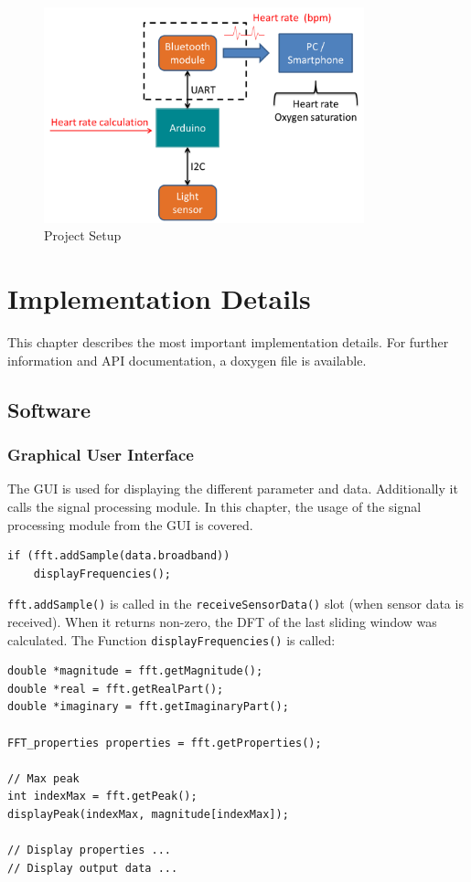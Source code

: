 \documentclass[notitlepage]{scrreprt}
\begin{document}
\begin{figure}[H]
	\centering
	\includegraphics[width=350px]{images/general_dataFlow_first.png}
	\caption{Project Setup}
	\label{fig:data-flow1}
\end{figure}

\chapter{Implementation Details}
\label{chap:impl-details}
This chapter describes the most important implementation details. For further information and API documentation, a doxygen file is available.

\section{Software}
\subsection{Graphical User Interface}
The GUI is used for displaying the different parameter and data. Additionally it calls the signal processing module. In this chapter, the usage of the signal processing module from the GUI is covered.

\begin{lstlisting}[caption=MainWindow.cpp]
if (fft.addSample(data.broadband))
	displayFrequencies();
\end{lstlisting}

\lstinline{fft.addSample()} is called in the \lstinline{receiveSensorData()} slot (when sensor data is received). When it returns non-zero, the DFT of the last sliding window was calculated. The Function \lstinline{displayFrequencies()} is called:

\begin{lstlisting}[caption=MainWindow.cpp]
double *magnitude = fft.getMagnitude();
double *real = fft.getRealPart();
double *imaginary = fft.getImaginaryPart();

FFT_properties properties = fft.getProperties();

// Max peak
int indexMax = fft.getPeak();
displayPeak(indexMax, magnitude[indexMax]);

// Display properties ...
// Display output data ...
\end{lstlisting}
\end{document}
